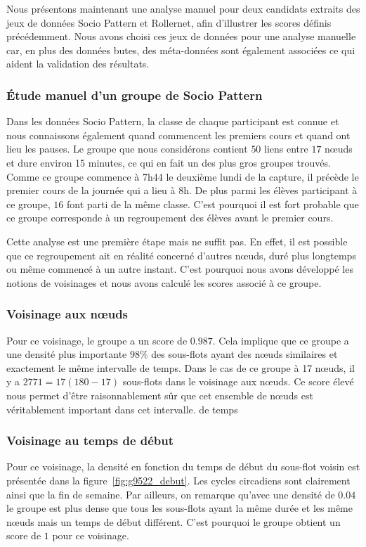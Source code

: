 
Nous présentons maintenant une analyse manuel pour deux candidats extraits des jeux de données Socio Pattern et Rollernet, afin d'illustrer les scores définis précédemment.
Nous avons choisi ces jeux de données pour une analyse manuelle car, en plus des données butes, des méta-données sont également associées ce qui aident la validation des résultats.

\subsubsection{\'Etude manuel d'un groupe de Socio Pattern}
Dans les données Socio Pattern, la classe de chaque participant est connue et nous connaissons également quand commencent les premiers cours et quand ont lieu les pauses.
Le groupe que nous considérons contient $50$ liens entre $17$ n\oe uds et dure environ 15 minutes, ce qui en fait un des plus gros groupes trouvés.
Comme ce groupe commence à 7h44 le deuxième lundi de la capture, il précède le premier cours de la journée qui a lieu à 8h.
De plus parmi les élèves participant à ce groupe, $16$ font parti de la même classe.
C'est pourquoi il est fort probable que ce groupe corresponde à un regroupement des élèves avant le premier cours.

Cette analyse est une première étape mais ne suffit pas.
En effet, il est possible que ce regroupement ait en réalité concerné d'autres n\oe uds, duré plus longtemps ou même commencé à un autre instant.
C'est pourquoi nous avons développé les notions de voisinages et nous avons calculé les scores associé à ce groupe.

\subsubsection*{Voisinage aux n\oe uds}
Pour ce voisinage, le groupe a un score de $0.987$.
Cela implique que ce groupe a une densité plus importante $98\%$ des sous-flots ayant des n\oe uds similaires et exactement le même intervalle de temps.
Dans le cas de ce groupe à 17 n\oe uds, il y a $2771=17(180-17)$ sous-flots dans le voisinage aux n\oe uds.
Ce score élevé nous permet d'être raisonnablement sûr que cet ensemble de n\oe uds est véritablement important dans cet intervalle. de temps

\subsubsection*{Voisinage au temps de début}
Pour ce voisinage, la densité en fonction du temps de début du sous-flot voisin est présentée dans la figure~\ref{fig:g9522_debut}.
Les cycles circadiens sont clairement ainsi que la fin de semaine.
Par ailleurs, on remarque qu'avec une densité de $0.04$ le groupe est plus dense que tous les sous-flots ayant la même durée et les même n\oe uds mais un temps de début différent.
C'est pourquoi le groupe obtient un score de $1$ pour ce voisinage.


